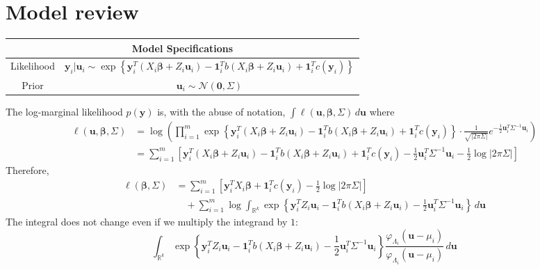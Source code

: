 \documentclass[11pt]{article}
\newcommand{\bs}{\boldsymbol}
\begin{document}
\section{Model review}
\begin{table}[!htbp]
\centering
  \begin{tabular}{*2c}
    \toprule
    \multicolumn{2}{c}{\textbf{Model Specifications}}\\
    \midrule
    Likelihood & $\bs{y}_{i}|\bs{u}_{i} \sim \exp\left\{\bs{y}_{i}^{T}\left(X_{i}\bs{\beta} + Z_{i}\bs{u}_{i} \right) - \bs{1}_{i}^{T}b\left(X_{i}\bs{\beta} + Z_{i}\bs{u}_{i} \right)+\bs{1}_{i}^{T}c(\bs{y}_{i}) \right\} $\\
    \midrule
    Prior & $\bs{u}_{i} \sim \mathcal{N}\left(\bs{0}, \Sigma \right)$\\
    \bottomrule
  \end{tabular}
\end{table}
The log-marginal likelihood $p(\bs{y})$ is, with the abuse of notation, $\int \ell \left(\bs{u}, \bs{\beta}, \Sigma \right)\, d\bs{u}$ where
\begin{align*}
  \ell(\bs{u}, \bs{\beta}, \Sigma) &= \log \left(\prod_{i=1}^{m} \exp \left\{\bs{y}_{i}^{T}\left(X_{i}\bs{\beta}+Z_{i}\bs{u}_{i} \right)-\bs{1}_{i}^{T}b\left(X_{i}\bs{\beta}+Z_{i}\bs{u}_{i} \right) + \bs{1}_{i}^{T}c(\bs{y}_{i}) \right\} \cdot \frac{1}{\sqrt{\left|2\pi \Sigma \right|}} e^{-\frac{1}{2}\bs{u}_{i}^{T}\Sigma^{-1}\bs{u}_{i}} \right)\\
  &= \sum_{i=1}^{m}\left[\bs{y}_{i}^{T}\left(X_{i}\bs{\beta}+Z_{i}\bs{u}_{i} \right)-\bs{1}_{i}^{T}b\left(X_{i}\bs{\beta}+Z_{i}\bs{u}_{i} \right) + \bs{1}_{i}^{T}c(\bs{y}_{i}) - \frac{1}{2}\bs{u}_{i}^{T}\Sigma^{-1}\bs{u}_{i} - \frac{1}{2}\log\left|2\pi \Sigma \right| \right]
\end{align*}
Therefore,
\begin{align*}
  \ell \left(\bs{\beta}, \Sigma \right) &= \sum_{i=1}^{m} \left[\bs{y}_{i}^{T}X_{i}\bs{\beta} + \bs{1}_{i}^{T}c\left(\bs{y}_{i} \right) - \frac{1}{2} \log \left|2\pi \Sigma \right|\right] \\
  & \quad + \sum_{i=1}^{m} \log \int_{\mathbb{R}^{k}} \exp \left\{ \bs{y}_{i}^{T}Z_{i}\bs{u}_{i} - \bs{1}_{i}^{T}b\left(X_{i}\bs{\beta} + Z_{i}\bs{u}_{i} \right)-\frac{1}{2}\bs{u}_{i}^{T}\Sigma^{-1}\bs{u}_{i} \right\}\, d\bs{u}
\end{align*}
The integral does not change even if we multiply the integrand by $1$:
\begin{equation}\label{eq1}
  \int_{\mathbb{R}^{k}} \exp \left\{ \bs{y}_{i}^{T}Z_{i}\bs{u}_{i} - \bs{1}_{i}^{T}b\left(X_{i}\bs{\beta} + Z_{i}\bs{u}_{i} \right)-\frac{1}{2}\bs{u}_{i}^{T}\Sigma^{-1}\bs{u}_{i} \right\}\frac{\varphi_{\Lambda_{i}} \left(\bs{u} - \mu_{i} \right)}{\varphi_{\Lambda_{i}} \left(\bs{u} - \mu_{i} \right)} \, d\bs{u}
\end{equation}
\end{document}
